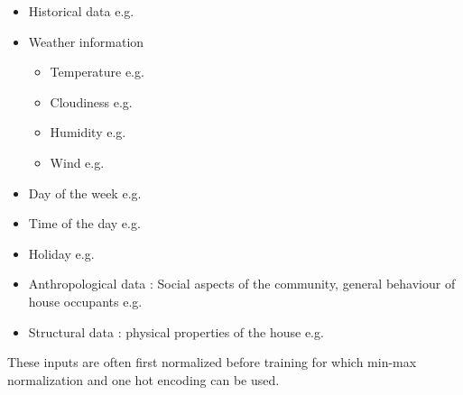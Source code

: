 \begin{itemize}
	\item Historical data e.g. \cite{Kong2019}
	\item Weather information
	\begin{itemize}
		\item Temperature e.g. \cite{Kong2019}
		\item Cloudiness e.g. \cite{Contaxi2006}
		\item Humidity e.g. \cite{Contaxi2006}
		\item Wind e.g. \cite{Charytoniuk1997}
	\end{itemize}
	\item Day of the week e.g. \cite{Kong2019}
	\item Time of the day e.g. \cite{Kong2019}
	\item Holiday e.g. \cite{Kong2019}
	\item Anthropological data : Social aspects of the community, general behaviour of house
	occupants e.g. \cite{Javed2012}
	\item Structural data : physical properties of the house e.g. \cite{Javed2012}
\end{itemize}

These inputs are often first normalized before training for which min-max normalization and one hot encoding can be used.

